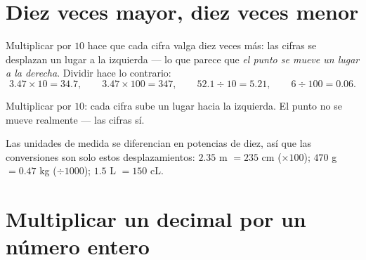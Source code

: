 \section{Diez veces mayor, diez veces menor}

\begin{proposition}\label{prop:g5:decimalops:shift}
Multiplicar por $10$ hace que cada cifra valga diez veces más: las
cifras se desplazan un lugar a la izquierda --- lo que parece que \emph{el punto
se mueve un lugar a la derecha}. Dividir hace lo contrario:
\[
3.47 \times 10 = 34.7, \qquad
3.47 \times 100 = 347, \qquad
52.1 \div 10 = 5.21, \qquad
6 \div 100 = 0.06 .
\]
\end{proposition}
\admitted

\begin{omfigure}

{\small Multiplicar por $10$: cada cifra sube un lugar hacia la
izquierda. El punto no se mueve realmente --- las cifras sí.}
\end{omfigure}

\begin{example}\label{ex:g5:decimalops:convert}
Las unidades de medida se diferencian en potencias de diez, así que las conversiones son solo
estos desplazamientos: $2.35$ m $= 235$ cm ($\times 100$); $470$ g
$= 0.47$ kg ($\div 1000$); $1.5$ L $= 150$ cL.
\end{example}

\section{Multiplicar un decimal por un número entero}

